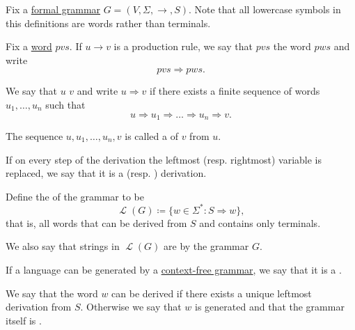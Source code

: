 \begin{definition}\label{def:grammar_derivation}\mcite\cite[page 104 \\ page 108]{Sipser2013}
  Fix a \hyperref[def:grammar]{formal grammar} \( G = (V, \Sigma, \to, S) \). Note that all lowercase symbols in this definitions are words rather than terminals.

  \begin{defenum}
     Fix a \hyperref[def:language/word]{word} \( pvs \). If \( u \to v \) is a production rule, we say that \( pvs \)  the word \( pws \) and write
    \begin{equation*}
      pvs \Rightarrow pws.
    \end{equation*}

     We say that \( u \)  \( v \) and write \( u \Rightarrow v \) if there exists a finite sequence of words \( u_1, \ldots, u_n \) such that
    \begin{equation*}
      u \Rightarrow u_1 \Rightarrow \ldots \Rightarrow u_n \Rightarrow v.
    \end{equation*}

    The sequence \( u, u_1, \ldots, u_n, v \) is called a  of \( v \) from \( u \).

     If on every step of the derivation the leftmost (resp. rightmost) variable is replaced, we say that it is a  (resp. ) derivation.

     Define the  of the grammar to be
    \begin{equation*}
      \mscrL(G) \coloneqq \{ w \in \Sigma^* \colon S \Rightarrow w \},
    \end{equation*}
    that is, all words that can be derived from \( S \) and contains only terminals.

    We also say that strings in \( \mscrL(G) \) are  by the grammar \( G \).

    If a language can be generated by a \hyperref[def:grammar/context_free]{context-free grammar}, we say that it is a .

    \mcite\cite[def. 2.7]{Sipser2013}We say that the word \( w \) can be derived  if there exists a unique leftmost derivation from \( S \). Otherwise we say that \( w \) is generated  and that the grammar itself is .
  \end{defenum}
\end{definition}

